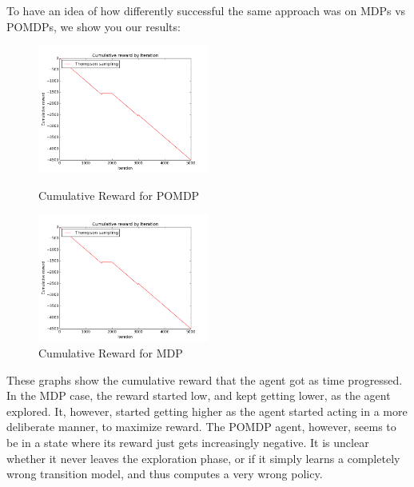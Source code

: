 \documentclass{pset}
\begin{document}
To have an idea of how differently successful the same approach was on MDPs vs
POMDPs, we show you our results:

\begin{figure}
\centering
\includegraphics[width=0.5\textwidth]{pomdp.png}
\caption{\label{fig:pomdp}Cumulative Reward for POMDP}
\includegraphics[width=0.5\textwidth]{pomdp.png}
\caption{\label{fig:mdp}Cumulative Reward for MDP}
\end{figure}

These graphs show the cumulative reward that the agent got as time progressed.
In the MDP case, the reward started low, and kept getting lower, as the agent
explored. It, however, started getting higher as the agent started acting in a
more deliberate manner, to maximize reward. The POMDP agent, however, seems to
be in a state where its reward just gets increasingly negative. It is unclear
whether it never leaves the exploration phase, or if it simply learns a completely
wrong transition model, and thus computes a very wrong policy.






\end{document}
